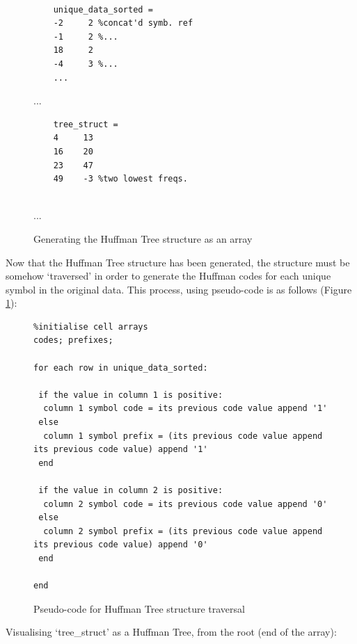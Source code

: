 \documentclass[12pt]{article}
\begin{document}
\begin{figure}[H]
\begin{minipage}{0.5\textwidth}
\begin{verbatim}
	
	\end{verbatim}
\end{minipage}
\begin{minipage}{0.5\textwidth}
	\centering
	\begin{verbatim}
	unique_data_sorted =
	-2     2 %concat'd symb. ref
	-1     2 %...
	18     2
	-4     3 %...
	...
	\end{verbatim}
	...
\end{minipage}
\begin{minipage}{0.5\textwidth}
	\centering
	\begin{verbatim}
	tree_struct = 
	4     13	
	16    20
	23    47 
	49    -3 %two lowest freqs.
	
	\end{verbatim}
	...
\end{minipage}
\caption{Generating the Huffman Tree structure as an array}
\end{figure}

Now that the Huffman Tree structure has been generated, the structure must be somehow `traversed' in order to generate the Huffman codes for each unique symbol in the original data. This process, using pseudo-code is as follows (Figure \ref{huff_codes_psuedo}):

\begin{figure}[H]
\begin{verbatim}
%initialise cell arrays
codes; prefixes;

for each row in unique_data_sorted:

 if the value in column 1 is positive:
  column 1 symbol code = its previous code value append '1'
 else
  column 1 symbol prefix = (its previous code value append its previous code value) append '1'
 end
 
 if the value in column 2 is positive:
  column 2 symbol code = its previous code value append '0'
 else
  column 2 symbol prefix = (its previous code value append its previous code value) append '0'
 end
 
end
\end{verbatim}
\caption{Pseudo-code for Huffman Tree structure traversal}
\label{huff_codes_psuedo}
\end{figure}

Visualising `tree\_struct' as a Huffman Tree, from the root (end of the array):
\end{document}
